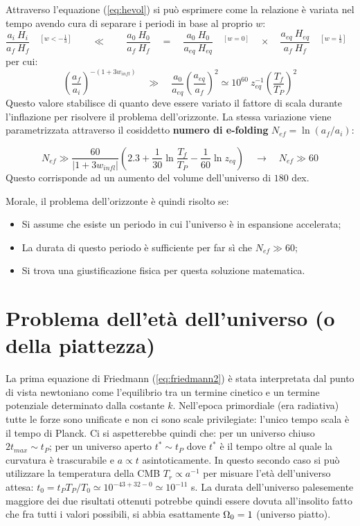 Attraverso l'equazione (\ref{eq:hevol}) si può esprimere come la relazione è variata nel tempo avendo cura di separare i periodi in base al proprio $w$:
\begin{equation*}
\frac{a_i ~H_i}{a_f ~H_f}\quad ^{[w<- \frac{1}{3}]} \qquad\ll\qquad \frac{a_0 ~H_0}{a_f ~H_f}\quad = \quad\frac{a_0 ~H_0}{a_{eq} ~H_{eq}} \quad ^{[w=0]}\quad \times \quad\frac{a_{eq} ~H_{eq}}{a_f ~H_f} \quad ^{[w= \frac{1}{3}]}\quad
\end{equation*}
per cui:
\begin{equation}
    \left( \frac{a_f}{a_i}\right)^{-(1+3w_{infl})} \quad\gg\quad \frac{a_0}{a_{eq}} \left( \frac{a_{eq}}{a_f}\right)^2 \simeq 10^{60} ~z_{eq}^{-1} \left( \frac{T_f}{T_P}\right)^2
\end{equation}
Questo valore stabilisce di quanto deve essere variato il fattore di scala durante l'inflazione per risolvere il problema dell'orizzonte. La stessa variazione viene parametrizzata attraverso il cosiddetto \textbf{numero di e-folding} $N_{ef}=\ln (a_f/a_i)$:

\begin{equation}
    N_{ef} \gg \frac{60}{\left | 1+3w_{infl}   \right |} \left(  2.3 + \frac{1}{30}\ln\frac{T_f}{T_P}-\frac{1}{60}\ln z_{eq}  \right) \quad \rightarrow \quad  N_{ef} \gg 60
\end{equation}
Questo corrisponde ad un aumento del volume dell'universo di $180$ dex.

\newpage
\noindent Morale, il problema dell'orizzonte è quindi risolto se:
\begin{itemize}
    \item Si assume che esiste un periodo in cui l'universo è in espansione accelerata;
    \item La durata di questo periodo è sufficiente per far sì che $N_{ef} \gg 60$;
    \item Si trova una giustificazione fisica per questa soluzione matematica.
\end{itemize}

\section{Problema dell'età dell'universo (o della piattezza)}
La prima equazione di Friedmann (\ref{eq:friedmann2}) è stata interpretata dal punto di vista newtoniano come l'equilibrio tra un termine cinetico e un termine potenziale determinato dalla costante $k$. Nell'epoca primordiale (era radiativa) tutte le forze sono unificate e non ci sono scale privilegiate: l'unico tempo scala è il tempo di Planck. Ci si aspetterebbe quindi che: per un universo chiuso $2t_{max}\sim t_P$; per un universo aperto $t^* \sim t_P$ dove $t^*$ è il tempo oltre al quale la curvatura è trascurabile e $a\propto t$ asintoticamente. In questo secondo caso si può utilizzare la temperatura della CMB $T_r\propto a^{-1}$ per misuare l'età dell'universo attesa: $t_0 = t_P T_P / T_0\simeq 10^{-43+32-0}\simeq 10^{-11}$ s. La durata dell'universo palesemente maggiore dei due risultati ottenuti potrebbe quindi essere dovuta all'insolito fatto che fra tutti i valori possibili, si abbia esattamente $\Omega_0=1$ (universo piatto). 

